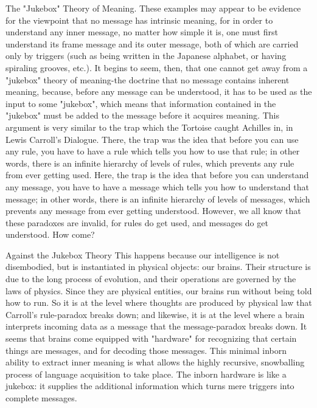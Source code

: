                        The "Jukebox" Theory of Meaning.
These examples may appear to be evidence for the viewpoint that no message has
intrinsic meaning, for in order to understand any inner message, no matter how simple it
is, one must first understand its frame message and its outer message, both of which are
carried only by triggers (such as being written in the Japanese alphabet, or having
spiraling grooves, etc.). It begins to seem, then, that one cannot get away from a
"jukebox" theory of meaning-the doctrine that no message contains inherent meaning,
because, before any message can be understood, it has to be used as the input to some
"jukebox", which means that information contained in the "jukebox" must be added to the
message before it acquires meaning.
        This argument is very similar to the trap which the Tortoise caught Achilles in, in
Lewis Carroll's Dialogue. There, the trap was the idea that before you can use any rule,
you have to have a rule which tells you how to use that rule; in other words, there is an
infinite hierarchy of levels of rules, which prevents any rule from ever getting used. Here,
the trap is the idea that before you can understand any message, you have to have a
message which tells you how to understand that message; in other words, there is an
infinite hierarchy of levels of messages, which prevents any message from ever getting
understood. However, we all know that these paradoxes are invalid, for rules do get used,
and messages do get understood. How come?

Against the Jukebox Theory
This happens because our intelligence is not disembodied, but is instantiated in physical
objects: our brains. Their structure is due to the long process of evolution, and their
operations are governed by the laws of physics. Since they are physical entities, our
brains run without being told how to run. So it is at the level where thoughts are produced
by physical law that Carroll's rule-paradox breaks down; and likewise, it is at the level
where a brain interprets incoming data as a message that the message-paradox breaks
down. It seems that brains come equipped with "hardware" for recognizing that certain
things are messages, and for decoding those messages. This minimal inborn ability to
extract inner meaning is what allows the highly recursive, snowballing process of
language acquisition to take place. The inborn hardware is like a jukebox: it supplies the
additional information which turns mere triggers into complete messages.





